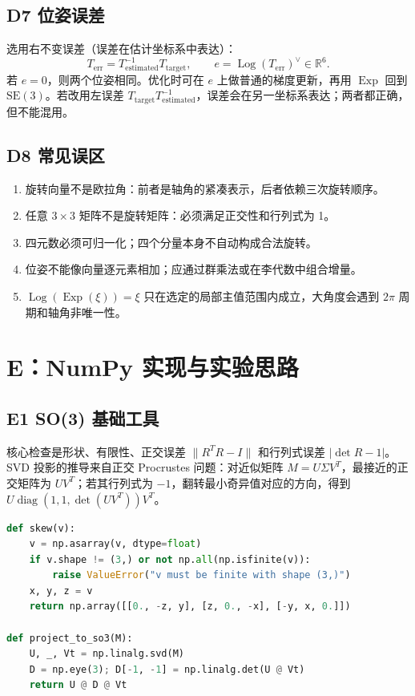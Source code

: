 \documentclass[UTF8,a4paper,11pt]{ctexart}
\newcommand{\R}{\mathbb{R}}
\newcommand{\SE}{\mathrm{SE}(3)}
\newcommand{\Exp}{\operatorname{Exp}}
\newcommand{\Log}{\operatorname{Log}}
\begin{document}
\subsection{D7 位姿误差}
选用右不变误差（误差在估计坐标系中表达）：
\[
T_{\mathrm{err}}=T_{\mathrm{estimated}}^{-1}T_{\mathrm{target}},
\qquad e=\Log(T_{\mathrm{err}})^\vee\in\R^6.
\]
若 $e=0$，则两个位姿相同。优化时可在 $e$ 上做普通的梯度更新，再用 $\Exp$ 回到 $\SE$。若改用左误差 $T_{\mathrm{target}}T_{\mathrm{estimated}}^{-1}$，误差会在另一坐标系表达；两者都正确，但不能混用。

\subsection{D8 常见误区}
\begin{enumerate}
\item 旋转向量不是欧拉角：前者是轴角的紧凑表示，后者依赖三次旋转顺序。
\item 任意 $3\times3$ 矩阵不是旋转矩阵：必须满足正交性和行列式为 1。
\item 四元数必须可归一化；四个分量本身不自动构成合法旋转。
\item 位姿不能像向量逐元素相加；应通过群乘法或在李代数中组合增量。
\item $\Log(\Exp(\xi))=\xi$ 只在选定的局部主值范围内成立，大角度会遇到 $2\pi$ 周期和轴角非唯一性。
\end{enumerate}

\section{E：NumPy 实现与实验思路}
\subsection{E1 SO(3) 基础工具}
核心检查是形状、有限性、正交误差 $\|R^TR-I\|$ 和行列式误差 $|\det R-1|$。SVD 投影的推导来自正交 Procrustes 问题：对近似矩阵 $M=U\Sigma V^T$，最接近的正交矩阵为 $UV^T$；若其行列式为 $-1$，翻转最小奇异值对应的方向，得到 $U\operatorname{diag}(1,1,\det(UV^T))V^T$。

\begin{lstlisting}[language=Python,basicstyle=\small\ttfamily,frame=single]
def skew(v):
    v = np.asarray(v, dtype=float)
    if v.shape != (3,) or not np.all(np.isfinite(v)):
        raise ValueError("v must be finite with shape (3,)")
    x, y, z = v
    return np.array([[0., -z, y], [z, 0., -x], [-y, x, 0.]])

def project_to_so3(M):
    U, _, Vt = np.linalg.svd(M)
    D = np.eye(3); D[-1, -1] = np.linalg.det(U @ Vt)
    return U @ D @ Vt
\end{lstlisting}
\end{document}
